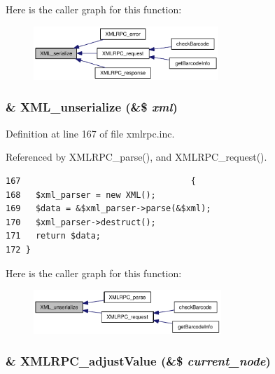 Here is the caller graph for this function:\nopagebreak
\begin{figure}[H]
\begin{center}
\leavevmode
\includegraphics[width=198pt]{xmlrpc_8inc_a1e9b05a06f28fabb86c10129f5890ef_icgraph}
\end{center}
\end{figure}
\hypertarget{xmlrpc_8inc_ef8f3de498a12b230d049cdee6a25145}{
\subsubsection{\setlength{\rightskip}{0pt plus 5cm}\& XML\_\-unserialize (\&\$ {\em xml})}}
\label{xmlrpc_8inc_ef8f3de498a12b230d049cdee6a25145}




Definition at line 167 of file xmlrpc.inc.

Referenced by XMLRPC\_\-parse(), and XMLRPC\_\-request().

\begin{Code}\begin{verbatim}167                                  {
168   $xml_parser = new XML();
169   $data = &$xml_parser->parse(&$xml);
170   $xml_parser->destruct();
171   return $data;
172 }
\end{verbatim}
\end{Code}




Here is the caller graph for this function:\nopagebreak
\begin{figure}[H]
\begin{center}
\leavevmode
\includegraphics[width=201pt]{xmlrpc_8inc_ef8f3de498a12b230d049cdee6a25145_icgraph}
\end{center}
\end{figure}
\hypertarget{xmlrpc_8inc_d936fe41ae9c3e0b90bd72ffe82a2969}{
\subsubsection{\setlength{\rightskip}{0pt plus 5cm}\& XMLRPC\_\-adjustValue (\&\$ {\em current\_\-node})}}
\label{xmlrpc_8inc_d936fe41ae9c3e0b90bd72ffe82a2969}




